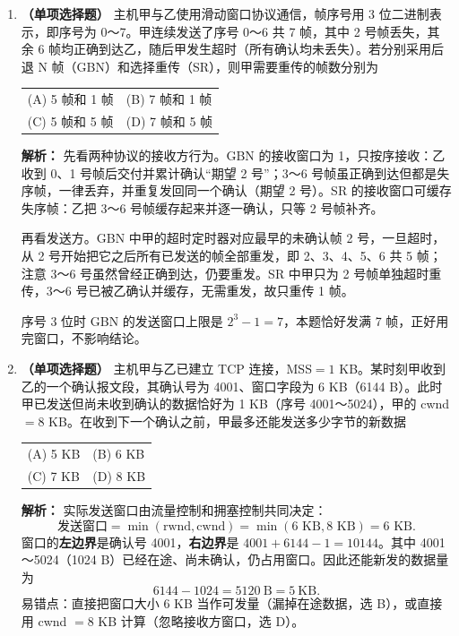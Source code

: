 \begin{enumerate}

\item \textbf{（单项选择题）} 主机甲与乙使用滑动窗口协议通信，帧序号用 3 位二进制表示，即序号为 0～7。甲连续发送了序号 0～6 共 7 帧，其中 2 号帧丢失，其余 6 帧均正确到达乙，随后甲发生超时（所有确认均未丢失）。若分别采用后退 N 帧（GBN）和选择重传（SR），则甲需要重传的帧数分别为
\begin{center}
\begin{tabular}{ll}
(A) 5 帧和 1 帧 & (B) 7 帧和 1 帧 \\[4pt]
(C) 5 帧和 5 帧 & (D) 7 帧和 5 帧
\end{tabular}
\end{center}

\ifshowsolutions\par\noindent\textbf{解析：} 先看两种协议的接收方行为。GBN 的接收窗口为 1，只按序接收：乙收到 0、1 号帧后交付并累计确认“期望 2 号”；3～6 号帧虽正确到达但都是失序帧，一律丢弃，并重复发回同一个确认（期望 2 号）。SR 的接收窗口可缓存失序帧：乙把 3～6 号帧缓存起来并逐一确认，只等 2 号帧补齐。

再看发送方。GBN 中甲的超时定时器对应最早的未确认帧 2 号，一旦超时，从 2 号开始把它之后所有已发送的帧全部重发，即 2、3、4、5、6 共 5 帧；注意 3～6 号虽然曾经正确到达，仍要重发。SR 中甲只为 2 号帧单独超时重传，3～6 号已被乙确认并缓存，无需重发，故只重传 1 帧。

序号 3 位时 GBN 的发送窗口上限是 $2^3-1=7$，本题恰好发满 7 帧，正好用完窗口，不影响结论。\else \answerarea \fi

\item \textbf{（单项选择题）} 主机甲与乙已建立 TCP 连接，MSS$=1$ KB。某时刻甲收到乙的一个确认报文段，其确认号为 4001、窗口字段为 6 KB（6144 B）。此时甲已发送但尚未收到确认的数据恰好为 1 KB（序号 4001～5024），甲的 cwnd $=8$ KB。在收到下一个确认之前，甲最多还能发送多少字节的新数据
\begin{center}
\begin{tabular}{ll}
(A) 5 KB & (B) 6 KB \\[4pt]
(C) 7 KB & (D) 8 KB
\end{tabular}
\end{center}

\ifshowsolutions\par\noindent\textbf{解析：} 实际发送窗口由流量控制和拥塞控制共同决定：
\[
\text{发送窗口}=\min(\text{rwnd},\text{cwnd})=\min(6\text{ KB},8\text{ KB})=6\text{ KB}.
\]
窗口的\textbf{左边界}是确认号 4001，\textbf{右边界}是 $4001+6144-1=10144$。其中 4001～5024（1024 B）已经在途、尚未确认，仍占用窗口。因此还能新发的数据量为
\[
6144-1024=5120\ \text{B}=5\ \text{KB}.
\]
易错点：直接把窗口大小 6 KB 当作可发量（漏掉在途数据，选 B），或直接用 cwnd $=8$ KB 计算（忽略接收方窗口，选 D）。\else \answerarea \fi


\end{enumerate}
